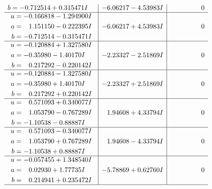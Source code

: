 \documentclass[1p]{elsarticle_modified}
\theoremstyle{definition}
\begin{document}
$$\begin{array}{c|c|c}
\begin{aligned}
b &= -0.712514 + 0.315471 I\end{aligned}
 & -6.06217 - 4.53983 I & \phantom{-0.000000 } 0 \\ \hline\begin{aligned}
u &= -0.166818 - 1.294900 I \\
a &= \phantom{-}1.151150 - 0.222395 I \\
b &= -0.712514 - 0.315471 I\end{aligned}
 & -6.06217 + 4.53983 I & \phantom{-0.000000 } 0 \\ \hline\begin{aligned}
u &= -0.120884 + 1.327580 I \\
a &= -0.35980 - 1.40170 I \\
b &= \phantom{-}0.217292 - 0.220142 I\end{aligned}
 & -2.23327 - 2.51869 I & \phantom{-0.000000 } 0 \\ \hline\begin{aligned}
u &= -0.120884 - 1.327580 I \\
a &= -0.35980 + 1.40170 I \\
b &= \phantom{-}0.217292 + 0.220142 I\end{aligned}
 & -2.23327 + 2.51869 I & \phantom{-0.000000 } 0 \\ \hline\begin{aligned}
u &= \phantom{-}0.571093 + 0.340077 I \\
a &= \phantom{-}1.053790 - 0.767289 I \\
b &= -1.10538 - 0.88887 I\end{aligned}
 & \phantom{-}1.94608 + 4.33794 I & \phantom{-0.000000 } 0 \\ \hline\begin{aligned}
u &= \phantom{-}0.571093 - 0.340077 I \\
a &= \phantom{-}1.053790 + 0.767289 I \\
b &= -1.10538 + 0.88887 I\end{aligned}
 & \phantom{-}1.94608 - 4.33794 I & \phantom{-0.000000 } 0 \\ \hline\begin{aligned}
u &= -0.057455 + 1.348540 I \\
a &= \phantom{-}0.02930 + 1.77735 I \\
b &= \phantom{-}0.214941 + 0.235472 I\end{aligned}
 & -5.78869 + 0.62760 I & \phantom{-0.000000 } 0\\
 \hline 
 \end{array}$$\newpage$$\begin{array}{c|c|c}  

\end{array}$$
\end{document}
